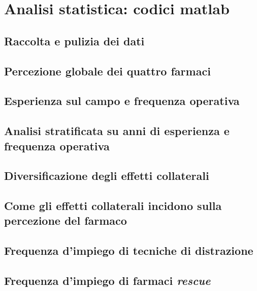 \chapter{Analisi statistica: codici matlab}

\section{Raccolta e pulizia dei dati}
\label{code:wrangling}


\section{Percezione globale dei quattro farmaci}
\label{code:quality-global}


\section{Esperienza sul campo e frequenza operativa}
\label{code:seniority-vs-experience}


\section{Analisi stratificata su anni di esperienza e frequenza operativa}
\label{code:quality-strati}


\section{Diversificazione degli effetti collaterali}
\label{code:adverse-effects-incidence}


\section{Come gli effetti collaterali incidono sulla percezione del farmaco}
\label{code:adverse-effects-perception}


\section{Frequenza d'impiego di tecniche di distrazione}
\label{code:misdirection-techniques}


\section{Frequenza d'impiego di farmaci \emph{rescue}}
\label{code:rescue}



